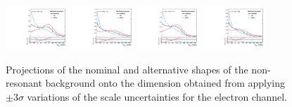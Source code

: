 \begin{figure}[htbp]
  \centering
  \includegraphics[width=0.21\textwidth]{fig/analysisAppendix/systs_nonRes_e_HP_nobb_LDy_MJJScale_ProjY.pdf}
  \includegraphics[width=0.21\textwidth]{fig/analysisAppendix/systs_nonRes_e_LP_nobb_LDy_MJJScale_ProjY.pdf}
  \includegraphics[width=0.21\textwidth]{fig/analysisAppendix/systs_nonRes_e_HP_nobb_HDy_MJJScale_ProjY.pdf}
  \includegraphics[width=0.21\textwidth]{fig/analysisAppendix/systs_nonRes_e_LP_nobb_HDy_MJJScale_ProjY.pdf}\\
  \caption{
    Projections of the nominal and alternative shapes of the non-resonant background onto the \MJ dimension obtained from applying $\pm3\sigma$ variations of the \MJ scale uncertainties for the electron channel.
  }
  \label{fig:systNonResMJ_MJJScale}
\end{figure}


